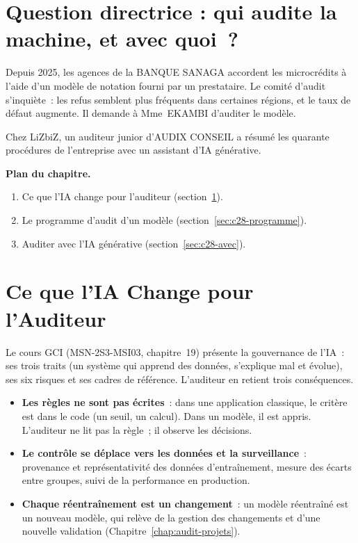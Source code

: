 \bigskip

\section*{Question directrice : qui audite la machine, et avec quoi~?}

Depuis 2025, les agences de la BANQUE SANAGA accordent les microcrédits à
l'aide d'un modèle de notation fourni par un prestataire. Le comité
d'audit s'inquiète~: les refus semblent plus fréquents dans certaines
régions, et le taux de défaut augmente. Il demande à Mme~EKAMBI d'auditer
le modèle.

Chez LiZbiZ, un auditeur junior d'AUDIX CONSEIL a résumé les quarante
procédures de l'entreprise avec un assistant d'IA générative.

\medskip
\textbf{Plan du chapitre.}
\begin{enumerate}
    \item Ce que l'IA change pour l'auditeur (section~\ref{sec:c28-risques}).
    \item Le programme d'audit d'un modèle (section~\ref{sec:c28-programme}).
    \item Auditer avec l'IA générative (section~\ref{sec:c28-avec}).
\end{enumerate}

\separateur

\section{Ce que l'IA Change pour l'Auditeur}
\label{sec:c28-risques}

Le cours GCI (MSN-2S3-MSI03, chapitre~19) présente la gouvernance de
l'IA~: ses trois traits (un système qui apprend des données, s'explique
mal et évolue), ses six risques et ses cadres de référence. L'auditeur en
retient trois conséquences.

\begin{itemize}
    \item \textbf{Les règles ne sont pas écrites}~: dans une application
          classique, le critère est dans le code (un seuil, un calcul). Dans
          un modèle, il est appris. L'auditeur ne lit pas la règle~; il
          observe les décisions.
    \item \textbf{Le contrôle se déplace vers les données et la
          surveillance}~: provenance et représentativité des données
          d'entraînement, mesure des écarts entre groupes, suivi de la
          performance en production.
    \item \textbf{Chaque réentraînement est un changement}~: un modèle
          réentraîné est un nouveau modèle, qui relève de la gestion des
          changements et d'une nouvelle validation
          (Chapitre~\ref{chap:audit-projets}).
\end{itemize}

